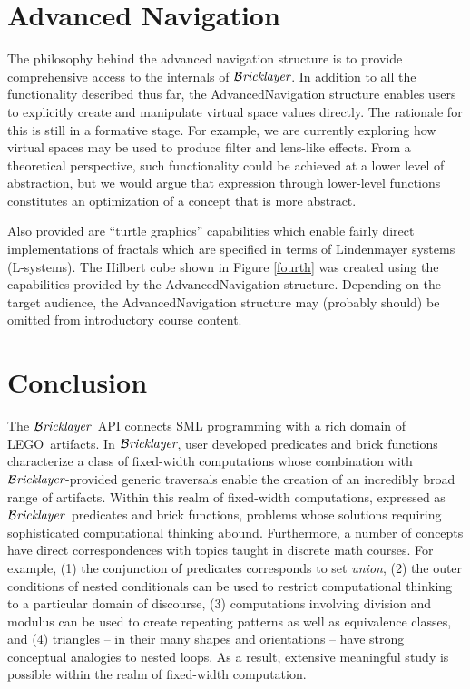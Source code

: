 \documentclass[submission,copyright,creativecommons]{eptcs}
\newcommand{\bricklayer}{\ensuremath{\mathcal{B}\emph{ricklayer}}}
\begin{document}
\section{Advanced Navigation}\label{section-advanced-navigation}


The philosophy behind the advanced navigation structure is to provide comprehensive access to the internals of \bricklayer. In addition to all the functionality described thus far, the AdvancedNavigation structure enables users to explicitly create and manipulate virtual space values directly. The rationale for this is still in a formative stage. For example, we are currently exploring how virtual spaces may be used to produce filter and lens-like effects. From a theoretical perspective, such functionality could be achieved at a lower level of abstraction, but we would argue that expression through lower-level functions constitutes an optimization of a concept that is more abstract.

Also provided are ``turtle graphics'' capabilities which enable fairly direct implementations of fractals which are specified in terms of Lindenmayer systems (L-systems). The Hilbert cube shown in Figure \ref{fourth} was created using the capabilities provided by the AdvancedNavigation structure. Depending on the target audience, the AdvancedNavigation structure may (probably should) be omitted from introductory course content.


\section{Conclusion}\label{section-conclusion}


The \bricklayer\ API connects SML programming with a rich domain of LEGO\textregistered\ artifacts. In \bricklayer, user developed predicates and brick functions characterize a class of fixed-width computations whose combination with \bricklayer\--provided generic traversals enable the creation of an incredibly broad range of artifacts. Within this realm of fixed-width computations, expressed as \bricklayer\ predicates and brick functions, problems whose solutions requiring sophisticated computational thinking abound.
Furthermore, a number of concepts have direct correspondences with topics taught in discrete math courses. For example, (1) the conjunction of predicates corresponds to set \emph{union}, (2) the outer conditions of nested conditionals can be used to restrict computational thinking to a particular domain of discourse, (3) computations involving division and modulus can be used to create repeating patterns as well as equivalence classes, and (4) triangles -- in their many shapes and orientations -- have strong conceptual analogies to nested loops. As a result, extensive meaningful study is possible within the realm of fixed-width computation.
\end{document}
